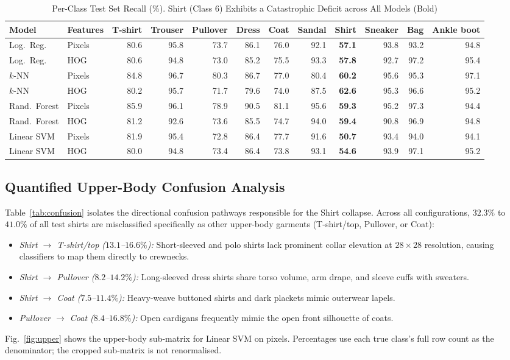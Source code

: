\documentclass[conference]{IEEEtran}
\begin{document}
\begin{table}[!t]
\centering
\caption{Per-Class Test Set Recall (\%). Shirt (Class 6) Exhibits a Catastrophic Deficit across All Models (Bold)}
\label{tab:recall}
\setlength{\tabcolsep}{4.5pt}
\begin{tabular}{llrrrrrrrrrr}
\toprule
Model & Features & T-shirt & Trouser & Pullover & Dress & Coat & Sandal & Shirt & Sneaker & Bag & Ankle boot\\
\midrule
Log.\ Reg. & Pixels & 80.6 & 95.8 & 73.7 & 86.1 & 76.0 & 92.1 & \textbf{57.1} & 93.8 & 93.2 & 94.8\\
Log.\ Reg. & HOG    & 80.6 & 94.8 & 73.0 & 85.2 & 75.5 & 93.3 & \textbf{57.8} & 92.7 & 97.2 & 95.4\\
$k$-NN     & Pixels & 84.8 & 96.7 & 80.3 & 86.7 & 77.0 & 80.4 & \textbf{60.2} & 95.6 & 95.3 & 97.1\\
$k$-NN     & HOG    & 80.2 & 95.7 & 71.7 & 79.6 & 74.0 & 87.5 & \textbf{62.6} & 95.3 & 96.6 & 95.2\\
Rand.\ Forest & Pixels & 85.9 & 96.1 & 78.9 & 90.5 & 81.1 & 95.6 & \textbf{59.3} & 95.2 & 97.3 & 94.4\\
Rand.\ Forest & HOG    & 81.2 & 92.6 & 73.6 & 85.5 & 74.7 & 94.0 & \textbf{59.4} & 90.8 & 96.9 & 94.8\\
Linear SVM & Pixels & 81.9 & 95.4 & 72.8 & 86.4 & 77.7 & 91.6 & \textbf{50.7} & 93.4 & 94.0 & 94.1\\
Linear SVM & HOG    & 80.0 & 94.8 & 73.4 & 86.4 & 73.8 & 93.1 & \textbf{54.6} & 93.9 & 97.1 & 95.2\\
\bottomrule
\end{tabular}
\end{table}

\subsection{Quantified Upper-Body Confusion Analysis}
Table~\ref{tab:confusion} isolates the directional confusion pathways
responsible for the Shirt collapse. Across all configurations,
$32.3\%$ to $41.0\%$ of all test shirts are misclassified specifically as
other upper-body garments (T-shirt/top, Pullover, or Coat):
\begin{itemize}
  \item \emph{Shirt $\to$ T-shirt/top ($13.1$--$16.6\%$):} Short-sleeved
    and polo shirts lack prominent collar elevation at $28\times 28$
    resolution, causing classifiers to map them directly to crewnecks.
  \item \emph{Shirt $\to$ Pullover ($8.2$--$14.2\%$):} Long-sleeved
    dress shirts share torso volume, arm drape, and sleeve cuffs with
    sweaters.
  \item \emph{Shirt $\to$ Coat ($7.5$--$11.4\%$):} Heavy-weave buttoned
    shirts and dark plackets mimic outerwear lapels.
  \item \emph{Pullover $\to$ Coat ($8.4$--$16.8\%$):} Open cardigans
    frequently mimic the open front silhouette of coats.
\end{itemize}
Fig.~\ref{fig:upper} shows the upper-body sub-matrix for Linear SVM
on pixels. Percentages use each true class's full row count as the
denominator; the cropped sub-matrix is not renormalised.
\end{document}
